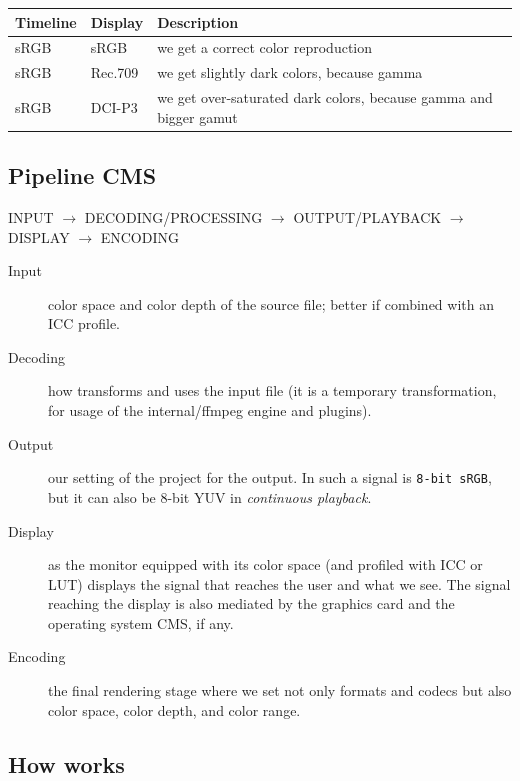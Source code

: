 \begin{center}
	\begin{tabular}{|l|l|p{8cm}|} 
		\hline
		\textbf{Timeline} & \textbf{Display} & \textbf{Description} \\ 
		\hline
		sRGB & sRGB & we get a correct color reproduction \\ 
		sRGB & Rec.709 & we get slightly dark colors, because gamma \\
		sRGB & DCI-P3 & we get over-saturated dark colors, because gamma and bigger gamut \\
		\hline
	\end{tabular}
\end{center}

\subsection{Pipeline CMS}%
\label{sub:pipeline_cms}

INPUT $\rightarrow$ DECODING/PROCESSING $\rightarrow$ OUTPUT/PLAYBACK $\rightarrow$ DISPLAY $\rightarrow$ ENCODING

\begin{description}
	\item[Input] color space and color depth of the source file; better if combined with an ICC profile.
	\item[Decoding] how \CGG{} transforms and uses the input file (it is a temporary transformation, for usage of the internal/ffmpeg engine and plugins).
	\item[Output] our setting of the project for the output. In \CGG{} such a signal is \texttt{8-bit sRGB}, but it can also be 8-bit YUV in \textit{continuous playback}.
	\item[Display] as the monitor equipped with its color space (and profiled with ICC or LUT) displays the signal that reaches the user and what we see. The signal reaching the display is also mediated by the graphics card and the operating system CMS, if any.
	\item[Encoding] the final rendering stage where we set not only formats and codecs but also color space, color depth, and color range.
\end{description}

\subsection{How \CGG{} works}%
\label{sub:how_cingg_works}

